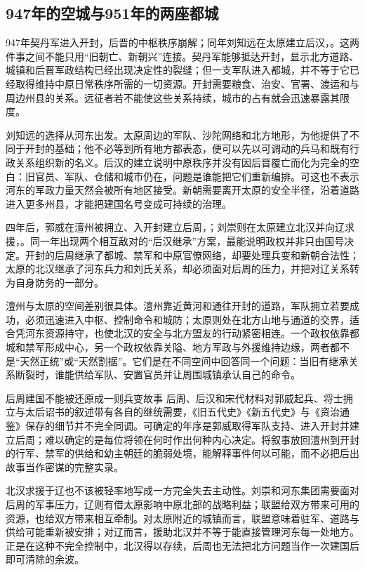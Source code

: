 \subsection{947年的空城与951年的两座都城}

947年契丹军进入开封，后晋的中枢秩序崩解；同年刘知远在太原建立后汉，。这两件事之间不能只用“旧朝亡、新朝兴”连接。契丹军能够抵达开封，显示北方道路、城镇和后晋军政结构已经出现决定性的裂缝；但一支军队进入都城，并不等于它已经取得维持中原日常秩序所需的一切资源。开封需要粮食、治安、官署、渡运和与周边州县的关系。远征者若不能使这些关系持续，城市的占有就会迅速暴露其限度。

刘知远的选择从河东出发。太原周边的军队、沙陀网络和北方地形，为他提供了不同于开封的基础；他不必等到所有地方都表态，便可以先以可调动的兵马和既有行政关系组织新的名义。后汉的建立说明中原秩序并没有因后晋覆亡而化为完全的空白：旧官员、军队、仓储和城市仍在，问题是谁能把它们重新编排。可这也不表示河东的军政力量天然会被所有地区接受。新朝需要离开太原的安全半径，沿着道路进入更多州县，才能把建国名号变成可持续的治理。

四年后，郭威在澶州被拥立、入开封建立后周，；刘崇则在太原建立北汉并向辽求援，。同一年出现两个相互敌对的“后汉继承”方案，最能说明政权并非只由国号决定。开封的后周继承了都城、禁军和中原官僚网络，却要处理兵变和新朝合法性；太原的北汉继承了河东兵力和刘氏关系，却必须面对后周的压力，并把对辽关系转为自身防务的一部分。

澶州与太原的空间差别很具体。澶州靠近黄河和通往开封的道路，军队拥立若要成功，必须迅速进入中枢、控制命令和城防；太原则处在北方山地与通道的交界，适合凭河东资源持守，也使北汉的安全与北方盟友的行动紧密相连。一个政权依靠都城和禁军形成中心，另一个政权依靠关隘、地方军政与外援维持边缘，两者都不是“天然正统”或“天然割据”。它们是在不同空间中回答同一个问题：当旧有继承关系断裂时，谁能供给军队、安置官员并让周围城镇承认自己的命令。

\begin{sourcenote}{后周建国不能被还原成一则兵变故事}
后周、后汉和宋代材料对郭威起兵、将士拥立与太后诏书的叙述带有各自的继统需要，《旧五代史》《新五代史》与《资治通鉴》保存的细节并不完全同调。可确定的年序是郭威取得军队支持、进入开封并建立后周；难以确定的是每位将领在何时作出何种内心决定。将叙事放回澶州到开封的行军、禁军的供给和幼主朝廷的脆弱处境，能解释事件何以可能，而不必把后出故事当作密谋的完整实录。
\end{sourcenote}

北汉求援于辽也不该被轻率地写成一方完全失去主动性。刘崇和河东集团需要面对后周的军事压力，辽则有借太原影响中原北部的战略利益；联盟给双方带来可用的资源，也给双方带来相互牵制。对太原附近的城镇而言，联盟意味着驻军、道路与供给可能重新被安排；对辽而言，援助北汉并不等于能直接管理河东每一处地方。正是在这种不完全控制中，北汉得以存续，后周也无法把北方问题当作一次建国后即可清除的余波。

